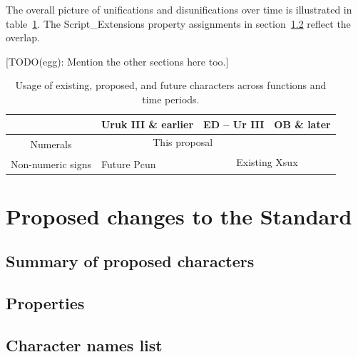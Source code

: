 \documentclass[10pt, a4paper, twoside]{article}
\begin{document}
The overall picture of unifications and disunifications over time is illustrated in table~\ref{tableUnificationsDisunifications}.
The Script\_Extensions property assignments in section~\ref{properties} reflect the overlap.

[TODO(egg): Mention the other sections here too.]

\begin{table}[htbp]
\begin{center}
\begin{tabular}{ l | l | l | l |} \cline{2-4}
                                                & Uruk III \& earlier & ED – Ur III                         & OB \& later    \\\hline
\multicolumn{1}{|c|}{\multirow{2}{*}{Numerals}} & \multicolumn{2}{|c|}{This proposal}                       &                \\\cline{2-4}
\multicolumn{1}{|c|}{}                          &                     & \multicolumn{2}{|c|}{\multirow{2}{*}{Existing Xsux}} \\\cline{1-2}
\multicolumn{1}{|c|}{Non-numeric signs}         & Future Pcun         & \multicolumn{2}{|c|}{}                               \\\hline
\end{tabular}
\caption{Usage of existing, proposed, and future characters across functions and time periods.}
\end{center}
\label{tableUnificationsDisunifications}
\end{table}

\section{Proposed changes to the Standard}
\label{proposal}
\subsection{Summary of proposed characters}
\subsection{Properties}
\label{properties}
\subsection{Character names list}
\end{document}
